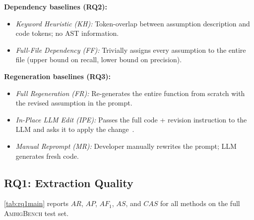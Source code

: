 \documentclass[sigconf,review,anonymous]{acmart}
\newcommand{\benchname}{\textsc{AmbigBench}\xspace}
\newcommand{\AR}{$\mathit{AR}$\xspace}
\newcommand{\AP}{$\mathit{AP}$\xspace}
\newcommand{\AFone}{$\mathit{AF_1}$\xspace}
\newcommand{\AS}{$\mathit{AS}$\xspace}
\newcommand{\CAS}{$\mathit{CAS}$\xspace}
\begin{document}
\textbf{Dependency baselines (RQ2):}
\begin{itemize}[noitemsep]
  \item \textit{Keyword Heuristic (KH):} Token-overlap between assumption description
        and code tokens; no AST information.
  \item \textit{Full-File Dependency (FF):} Trivially assigns every assumption to the
        entire file (upper bound on recall, lower bound on precision).
\end{itemize}

\textbf{Regeneration baselines (RQ3):}
\begin{itemize}[noitemsep]
  \item \textit{Full Regeneration (FR):} Re-generates the entire function from scratch
        with the revised assumption in the prompt.
  \item \textit{In-Place LLM Edit (IPE):} Passes the full code + revision instruction to
        the LLM and asks it to apply the change~\cite{xia2023chatrepair}.
  \item \textit{Manual Reprompt (MR):} Developer manually rewrites the prompt;
        LLM generates fresh code.
\end{itemize}

\subsection{RQ1: Extraction Quality}
\label{sec:rq1}

\cref{tab:rq1main} reports \AR, \AP, \AFone, \AS, and \CAS for all methods on the full
\benchname test set.
\end{document}
